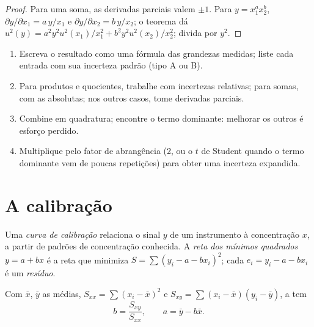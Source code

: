 \begin{proof}
Para uma soma, as derivadas parciais valem $\pm1$. Para $y = x_1^ax_2^b$, $\partial y/\partial x_1 =
a\,y/x_1$ e $\partial y/\partial x_2 = b\,y/x_2$; o teorema dá $u^2(y) = a^2y^2u^2(x_1)/x_1^2 +
b^2y^2u^2(x_2)/x_2^2$; divida por $y^2$.
\end{proof}

\begin{method}[Propagar]\label{met:b2:measurement-statistics:propagate}
\begin{enumerate}
  \item Escreva o resultado como uma fórmula das grandezas medidas; liste cada entrada com sua incerteza
        padrão (tipo A ou B).
  \item Para produtos e quocientes, trabalhe com incertezas relativas; para somas, com as absolutas;
        nos outros casos, tome derivadas parciais.
  \item Combine em quadratura; encontre o termo dominante: melhorar os outros é esforço perdido.
  \item Multiplique pelo fator de abrangência (2, ou o $t$ de Student quando o termo dominante vem de
        poucas repetições) para obter uma incerteza expandida.
\end{enumerate}
\end{method}

\section{A calibração}

\begin{definition}\label{def:b2:measurement-statistics:calibration}
Uma \emph{curva de calibração} relaciona o sinal $y$ de um instrumento à
concentração $x$, a partir de padrões de concentração conhecida. A \emph{reta dos mínimos
quadrados} $y = a + bx$ é a reta que minimiza $S = \sum (y_i - a -
bx_i)^2$; cada $e_i = y_i - a - bx_i$ é um \emph{resíduo}.
\end{definition}

\begin{theorem}\label{thm:b2:measurement-statistics:least-squares}
Com $\bar x$, $\bar y$ as médias, $S_{xx} = \sum(x_i - \bar x)^2$ e $S_{xy} = \sum(x_i - \bar x)(y_i -
\bar y)$, a  tem
\begin{equation*}
b = \frac{S_{xy}}{S_{xx}}, \qquad a = \bar y - b\bar x.
\end{equation*}
\end{theorem}

